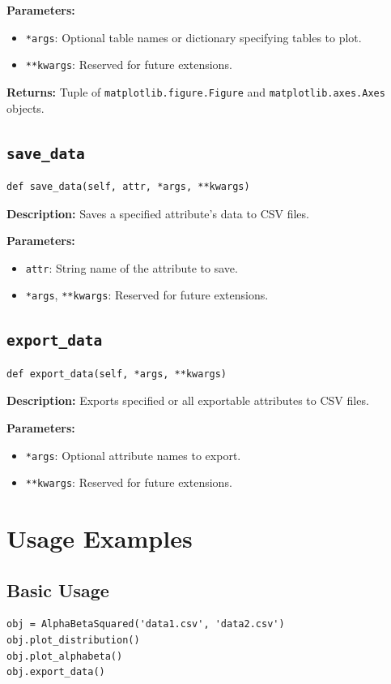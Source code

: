 \documentclass[
	ngerman,							%
	a4paper,							%
	11pt,							%
	oneside							%
	]{article}							%
\begin{document}
\textbf{Parameters:}
\begin{itemize}
    \item \texttt{*args}: Optional table names or dictionary specifying tables to plot.
    \item \texttt{**kwargs}: Reserved for future extensions.
\end{itemize}

\textbf{Returns:} Tuple of \texttt{matplotlib.figure.Figure} and \texttt{matplotlib.axes.Axes} objects.

\subsection{\texttt{save\_data}}
\begin{lstlisting}
def save_data(self, attr, *args, **kwargs)
\end{lstlisting}
\textbf{Description:} Saves a specified attribute’s data to CSV files.

\textbf{Parameters:}
\begin{itemize}
    \item \texttt{attr}: String name of the attribute to save.
    \item \texttt{*args}, \texttt{**kwargs}: Reserved for future extensions.
\end{itemize}

\subsection{\texttt{export\_data}}
\begin{lstlisting}
def export_data(self, *args, **kwargs)
\end{lstlisting}
\textbf{Description:} Exports specified or all exportable attributes to CSV files.

\textbf{Parameters:}
\begin{itemize}
    \item \texttt{*args}: Optional attribute names to export.
    \item \texttt{**kwargs}: Reserved for future extensions.
\end{itemize}

\section{Usage Examples}
\subsection*{Basic Usage}
\begin{lstlisting}
obj = AlphaBetaSquared('data1.csv', 'data2.csv')
obj.plot_distribution()
obj.plot_alphabeta()
obj.export_data()
\end{lstlisting}
\end{document}
